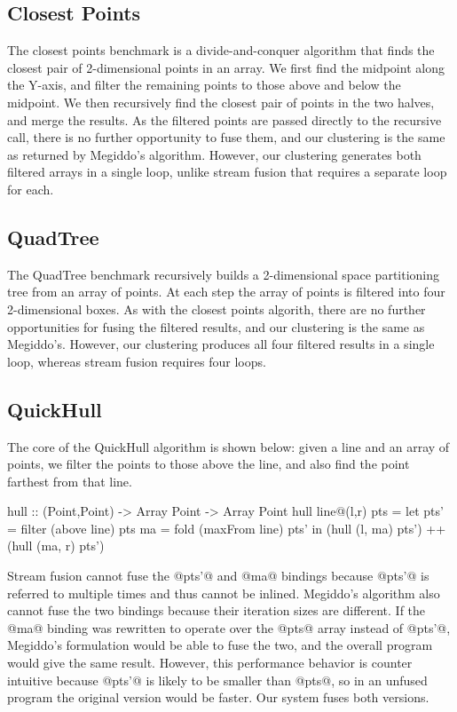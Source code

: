 \subsection{Closest Points}
The closest points benchmark is a divide-and-conquer algorithm that finds the closest pair of 2-dimensional points in an array. We first find the midpoint along the Y-axis, and filter the remaining points to those above and below the midpoint. We then recursively find the closest pair of points in the two halves, and merge the results. As the filtered points are passed directly to the recursive call, there is no further opportunity to fuse them, and our clustering is the same as returned by Megiddo's algorithm. However, our clustering generates both filtered arrays in a single loop, unlike stream fusion that requires a separate loop for each.


\subsection{QuadTree}
The QuadTree benchmark recursively builds a 2-dimensional space partitioning tree from an array of points. At each step the array of points is filtered into four 2-dimensional boxes. As with the closest points algorith, there are no further opportunities for fusing the filtered results, and our clustering is the same as Megiddo's. However, our clustering produces all four filtered results in a single loop, whereas stream fusion requires four loops.


\subsection{QuickHull}
The core of the QuickHull algorithm is shown below: given a line and an array of points, we filter the points to those above the line, and also find the point farthest from that line.

\begin{code}
hull :: (Point,Point) -> Array Point -> Array Point
hull line@(l,r) pts
 = let pts' = filter (above   line) pts
       ma   = fold   (maxFrom line) pts'
   in (hull (l, ma) pts') ++ (hull (ma, r) pts')
\end{code}

Stream fusion cannot fuse the @pts'@ and @ma@ bindings because @pts'@ is referred to multiple times and thus cannot be inlined. Megiddo's algorithm also cannot fuse the two bindings because their iteration sizes are different. If the @ma@ binding was rewritten to operate over the @pts@ array instead of @pts'@, Megiddo's formulation would be able to fuse the two, and the overall program would give the same result. However, this performance behavior is counter intuitive because @pts'@ is likely to be smaller than @pts@, so in an unfused program the original version would be faster. Our system fuses both versions.

